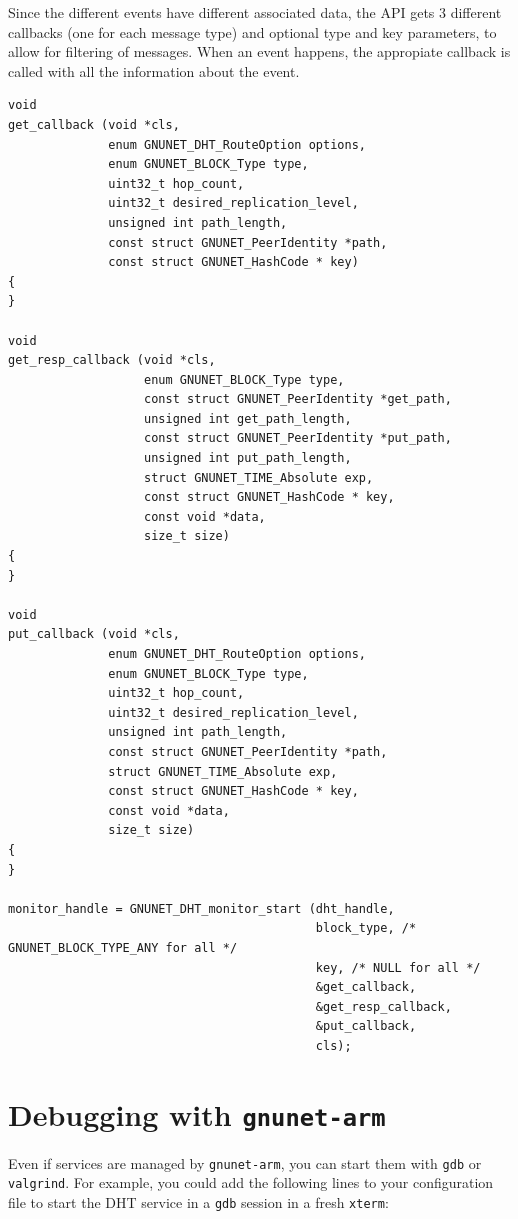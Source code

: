 \documentclass[10pt]{article}
\begin{document}
Since the different events have different associated data, the API gets 3
different callbacks (one for each message type) and optional type and key parameters,
to allow for filtering of messages. When an event happens, the appropiate callback
is called with all the information about the event.
\lstset{language=C}
\begin{lstlisting}
void
get_callback (void *cls,
              enum GNUNET_DHT_RouteOption options,
              enum GNUNET_BLOCK_Type type,
              uint32_t hop_count,
              uint32_t desired_replication_level,
              unsigned int path_length,
              const struct GNUNET_PeerIdentity *path,
              const struct GNUNET_HashCode * key)
{
}

void
get_resp_callback (void *cls,
                   enum GNUNET_BLOCK_Type type,
                   const struct GNUNET_PeerIdentity *get_path,
                   unsigned int get_path_length,
                   const struct GNUNET_PeerIdentity *put_path,
                   unsigned int put_path_length,
                   struct GNUNET_TIME_Absolute exp,
                   const struct GNUNET_HashCode * key,
                   const void *data,
                   size_t size)
{
}

void
put_callback (void *cls,
              enum GNUNET_DHT_RouteOption options,
              enum GNUNET_BLOCK_Type type,
              uint32_t hop_count,
              uint32_t desired_replication_level,
              unsigned int path_length,
              const struct GNUNET_PeerIdentity *path,
              struct GNUNET_TIME_Absolute exp,
              const struct GNUNET_HashCode * key,
              const void *data,
              size_t size)
{
}

monitor_handle = GNUNET_DHT_monitor_start (dht_handle,
                                           block_type, /* GNUNET_BLOCK_TYPE_ANY for all */
                                           key, /* NULL for all */
                                           &get_callback,
                                           &get_resp_callback,
                                           &put_callback,
                                           cls);
\end{lstlisting}


\section{Debugging with {\tt gnunet-arm}}

Even if services are managed by {\tt gnunet-arm}, you can start them with 
{\tt gdb} or {\tt valgrind}.  For example, you could add the following lines
to your configuration file to start the DHT service in a {\tt gdb} session in a
fresh {\tt xterm}:
\end{document}
